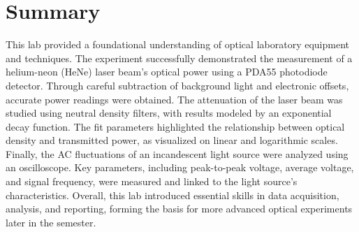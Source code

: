 \documentclass[12pt]{article}
\begin{document}
\section*{Summary}
This lab provided a foundational understanding of optical laboratory equipment and techniques. The experiment successfully demonstrated the measurement of a helium-neon (HeNe) laser beam's optical power using a PDA55 photodiode detector. Through careful subtraction of background light and electronic offsets, accurate power readings were obtained. The attenuation of the laser beam was studied using neutral density filters, with results modeled by an exponential decay function. The fit parameters highlighted the relationship between optical density and transmitted power, as visualized on linear and logarithmic scales. Finally, the AC fluctuations of an incandescent light source were analyzed using an oscilloscope. Key parameters, including peak-to-peak voltage, average voltage, and signal frequency, were measured and linked to the light source's characteristics. Overall, this lab introduced essential skills in data acquisition, analysis, and reporting, forming the basis for more advanced optical experiments later in the semester.
\end{document}
